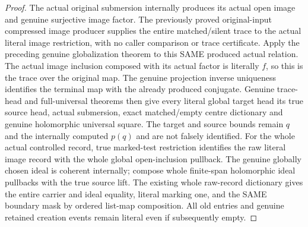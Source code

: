 \begin{proof}
The actual original submersion internally produces its actual open image and genuine surjective image factor. The previously proved original-input compressed image producer supplies the entire matched/silent trace to the actual literal image restriction, with no caller comparison or trace certificate. Apply the preceding genuine globalization theorem to this SAME produced actual relation. The actual image inclusion composed with its actual factor is literally $f$, so this is the trace over the original map. The genuine projection inverse uniqueness identifies the terminal map with the already produced conjugate. Genuine trace-head and full-universal theorems then give every literal global target head its true source head, actual submersion, exact matched/empty centre dictionary and genuine holomorphic universal square. The target and source bounds remain $q$ and the internally computed $p(q)$ and are not falsely identified. For the whole actual controlled record, true marked-test restriction identifies the raw literal image record with the whole global open-inclusion pullback. The genuine globally chosen ideal is coherent internally; compose whole finite-span holomorphic ideal pullbacks with the true source lift. The existing whole raw-record dictionary gives the entire carrier and ideal equality, literal marking one, and the SAME boundary mask by ordered list-map composition. All old entries and genuine retained creation events remain literal even if subsequently empty.
\end{proof}


